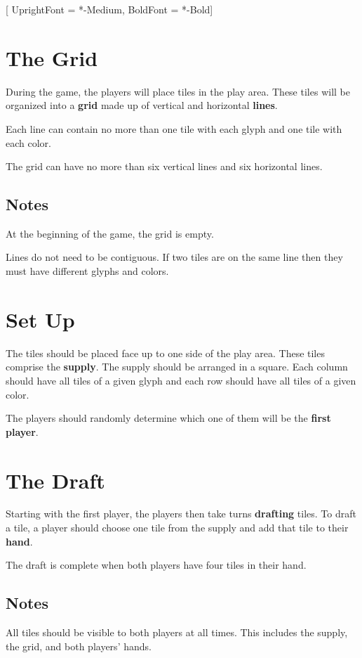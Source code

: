 \setmainfont{Quicksand}[
	UprightFont = *-Medium,
	BoldFont = *-Bold]
\raggedright

\section*{The Grid}
%

During the game, the players will place tiles in the play area. These tiles will be organized into a \textbf{grid} made up of vertical and horizontal \textbf{lines}.

Each line can contain no more than one tile with each glyph and one tile with each color.

The grid can have no more than six vertical lines and six horizontal lines.

\subsection*{Notes}
At the beginning of the game, the grid is empty.

Lines do not need to be contiguous.
If two tiles are on the same line then they must have different glyphs and colors.

\section*{Set Up}
The tiles should be placed face up to one side of the play area. These tiles comprise the \textbf{supply}. The supply should be arranged in a square. Each column should have all tiles of a given glyph and each row should have all tiles of a given color.

The players should randomly determine which one of them will be the \textbf{first player}.

\section*{The Draft}
Starting with the first player, the players then take turns \textbf{drafting} tiles. To draft a tile, a player should choose one tile from the supply and add that tile to their \textbf{hand}.

The draft is complete when both players have four tiles in their hand.

\subsection*{Notes}
All tiles should be visible to both players at all times.  This includes the supply, the grid, and both players' hands.

